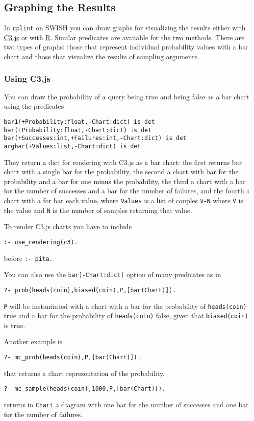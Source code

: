 \subsection{Graphing the Results}
\label{graphing}

In \texttt{cplint} on SWISH you can draw graphs
for visualizing the results either with \href{http://www.c3js.org/}{C3.js} or with \href{https://www.r-project.org/}{R}. Similar predicates are avaiiable for the two methods.
 There are two types
of graphs: those that represent individual probability values with a bar chart and those that
visualize the results of sampling arguments.

\subsubsection{Using C3.js}
You can draw the probability of a query being true and
being false as a bar chart using the predicates
\begin{verbatim}
bar1(+Probability:float,-Chart:dict) is det
bar(+Probability:float,-Chart:dict) is det
bar(+Successes:int,+Failures:int,-Chart:dict) is det
argbar(+Values:list,-Chart:dict) is det
\end{verbatim}
They return  a dict for rendering with C3.js as a bar chart:
the first  returns bar chart with
a single bar for the probability,  the second a chart with
bar for the probability and a bar for one minus the probability,
the third a  chart with
a bar for the number of successes and a bar for the number of failures, and
the fourth a  chart with
a for bar each value, where \verb|Values| is a list of couples \verb|V-N| where
  \verb|V| is the value and \verb|N| is the number of samples
  returning that value.
 
To render C3.js charts  you have to include
\begin{verbatim}
:- use_rendering(c3).
\end{verbatim}
before \verb|:- pita.| 

You can also use the  \verb|bar(-Chart:dict)| option of many predicates
as in
\begin{verbatim}
?- prob(heads(coin),biased(coin),P,[bar(Chart)]).
\end{verbatim}
\verb|P| will be instantiated with a
 chart with
a bar for the probability of \verb|heads(coin)| true and a bar for the probability of \verb|heads(coin)| false,
given that \verb|biased(coin)| is true.

Another example is
\begin{verbatim}
?- mc_prob(heads(coin),P,[bar(Chart)]).
\end{verbatim}
that returns a chart representation of the probability.
\begin{verbatim}
?- mc_sample(heads(coin),1000,P,[bar(Chart)]).
\end{verbatim}
returns in \verb|Chart| a diagram with one bar for the number of successes and
one bar for the number of failures.

